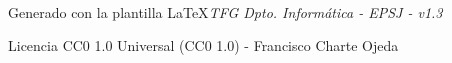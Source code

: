 \documentclass[12pt, a4paper, twoside]{report}   %
\begin{document}
    \Portada~			



    \cleardoublepage
    \tableofcontents  %


    \clearpage\thispagestyle{empty}\cleardoublepage
    \listoffigures		%

    \clearpage\thispagestyle{empty}\cleardoublepage
    \listoftables 		%

    \clearpage\thispagestyle{empty}\cleardoublepage
    \listofalgorithms
    
    \clearpage\thispagestyle{empty}\cleardoublepage
    \lstlistoflistings		%
          
    \clearpage\thispagestyle{empty}\cleardoublepage


  
\clearpage\thispagestyle{empty}\cleardoublepage


\clearpage\thispagestyle{empty}\cleardoublepage


\clearpage\thispagestyle{empty}\cleardoublepage


\clearpage\thispagestyle{empty}\cleardoublepage


\clearpage\thispagestyle{empty}\cleardoublepage


\clearpage\thispagestyle{empty}\cleardoublepage





\clearpage\thispagestyle{empty}
\begin{center}
{\color{flashwhite} Generado con la plantilla \LaTeX \textit{TFG Dpto. Informática - EPSJ - v1.3} \par Licencia CC0 1.0 Universal (CC0 1.0) - Francisco Charte Ojeda}
\end{center}
\end{document}
